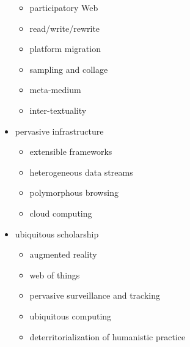 \begin{itemize}
  \begin{itemize}
    \item participatory Web
    \item	read/write/rewrite
    \item	platform migration
    \item	sampling and collage
    \item	meta-medium
    \item	inter-textuality
  \end{itemize}
  \item pervasive infrastructure
  \begin{itemize}
    \item extensible frameworks
    \item	heterogeneous data streams
    \item	polymorphous browsing
    \item	cloud computing
  \end{itemize}
  \item ubiquitous scholarship
  \begin{itemize}
    \item augmented reality
    \item	web of things
    \item	pervasive surveillance and tracking
    \item	ubiquitous computing
    \item	deterritorialization of humanistic practice
  \end{itemize}
\end{itemize}